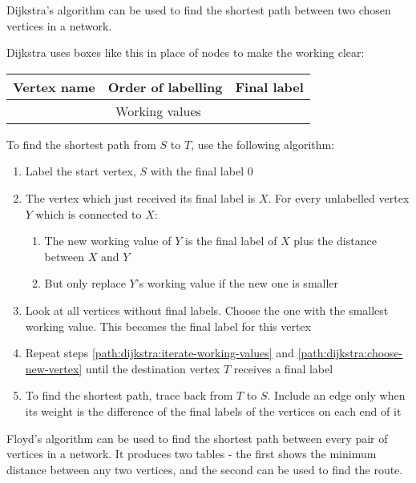 \documentclass[../main.tex]{subfile}
\begin{document}


Dijkstra's algorithm can be used to find the shortest path between two chosen vertices in a network.

Dijkstra uses boxes like this in place of nodes to make the working clear:

\begin{center}
\begin{tabular}{|c|c|c|}
	\hline
	Vertex name & Order of labelling & Final label\\
	\hline
	\multicolumn{3}{|c|}{Working values}\\
	\hline
\end{tabular}
\end{center}

To find the shortest path from $S$ to $T$, use the following algorithm:

\begin{enumerate}
	\item Label the start vertex, $S$ with the final label 0
	\item\label{path:dijkstra:iterate-working-values} The vertex which just received its final label is $X$. For every unlabelled vertex $Y$ which is connected to $X$: \begin{enumerate}
			\item The new working value of $Y$ is the final label of $X$ plus the distance between $X$ and $Y$
			\item But only replace $Y$'s working value if the new one is smaller
	\end{enumerate}
	\item\label{path:dijkstra:choose-new-vertex} Look at all vertices without final labels. Choose the one with the smallest working value. This becomes the final label for this vertex
	\item Repeat steps \ref{path:dijkstra:iterate-working-values} and \ref{path:dijkstra:choose-new-vertex} until the destination vertex $T$ receives a final label
	\item To find the shortest path, trace back from $T$ to $S$. Include an edge only when its weight is the difference of the final labels of the vertices on each end of it
\end{enumerate}


Floyd's algorithm can be used to find the shortest path between every pair of vertices in a network. It produces two tables - the first shows the minimum distance between any two vertices, and the second can be used to find the route.
\end{document}

